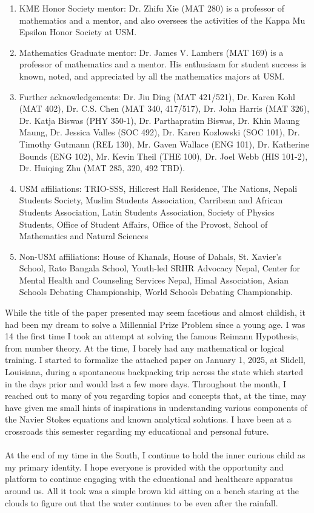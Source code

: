 \documentclass{article}
\begin{document}
\begin{enumerate}
    \item KME Honor Society mentor: Dr. Zhifu Xie (MAT 280) is a professor of mathematics and a mentor, and also oversees the activities of the Kappa Mu Epsilon Honor Society at USM. 
    \item Mathematics Graduate mentor: Dr. James V. Lambers (MAT 169) is a professor of mathematics and a mentor. His enthusiasm for student success is known, noted, and appreciated by all the mathematics majors at USM. 
    \item Further acknowledgements: Dr. Jiu Ding (MAT 421/521), Dr. Karen Kohl (MAT 402), Dr. C.S. Chen (MAT 340, 417/517), Dr. John Harris (MAT 326), Dr. Katja Biswas (PHY 350-1), Dr. Parthapratim Biswas, Dr. Khin Maung Maung, Dr. Jessica Valles (SOC 492), Dr. Karen Kozlowski (SOC 101), Dr. Timothy Gutmann (REL 130), Mr. Gaven Wallace (ENG 101), Dr. Katherine Bounds (ENG 102), Mr. Kevin Theil (THE 100), Dr. Joel Webb (HIS 101-2), Dr. Huiqing Zhu (MAT 285, 320, 492 TBD). 
    \item USM affiliations: TRIO-SSS, Hillcrest Hall Residence, The Nations, Nepali Students Society, Muslim Students Association, Carribean and African Students Association, Latin Students Association, Society of Physics Students, Office of Student Affairs, Office of the Provost, School of Mathematics and Natural Sciences 
    \item Non-USM affiliations: House of Khanals, House of Dahals, St. Xavier's School, Rato Bangala School, Youth-led SRHR Advocacy Nepal, Center for Mental Health and Counseling Services Nepal, Himal Association, Asian Schools Debating Championship, World Schools Debating Championship.
\end{enumerate}
While the title of the paper presented may seem facetious and almost childish, it had been my dream to solve a Millennial Prize Problem since a young age. I was 14 the first time I took an attempt at solving the famous Reimann Hypothesis, from number theory. At the time, I barely had any mathematical or logical training. I started to formalize the attached paper on January 1, 2025, at Slidell, Louisiana, during a spontaneous backpacking trip across the state which started in the days prior and would last a few more days. Throughout the month, I reached out to many of you regarding topics and concepts that, at the time, may have given me small hints of inspirations in understanding various components of the Navier Stokes equations and known analytical solutions. I have been at a crossroads this semester regarding my educational and personal future. \\ \\ 
At the end of my time in the South, I continue to hold the inner curious child as my primary identity. I hope everyone is provided with the opportunity and platform to continue engaging with the educational and healthcare apparatus around us. All it took was a simple brown kid sitting on a bench staring at the clouds to figure out that the water continues to be even after the rainfall. 
\end{document}
